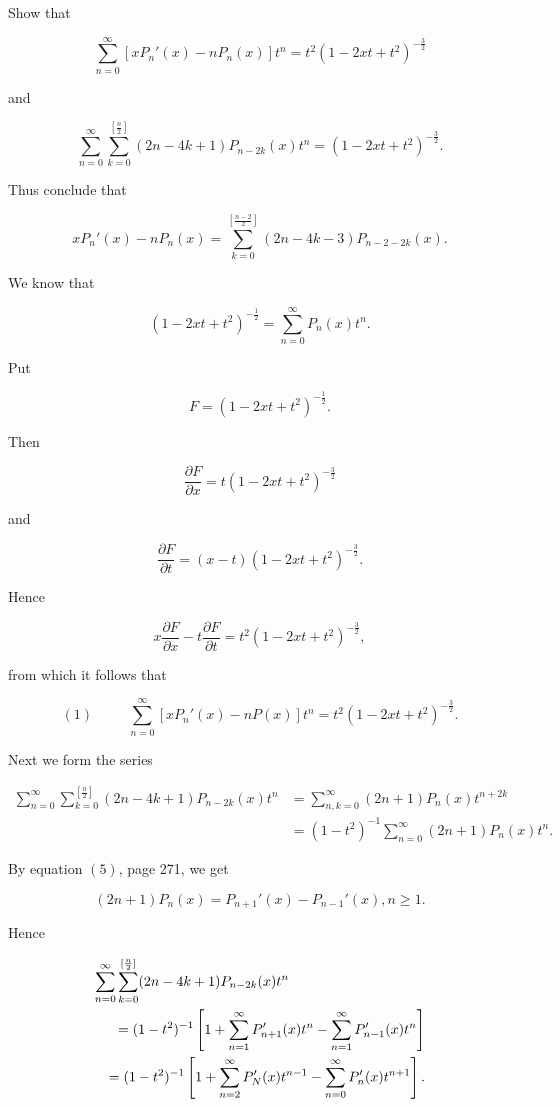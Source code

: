 \begin{problem}\label{problem4chapter10}
Show that

$$\displaystyle\sum_{n=0}^{\infty} [xP_n'(x) - nP_n(x)]t^n = t^2 (1-2xt+t^2)^{-\frac{3}{2}}$$

and

$$\displaystyle\sum_{n=0}^{\infty} \displaystyle\sum_{k=0}^{[\frac{n}{2}]} (2n-4k+1) P_{n-2k}(x)t^n = (1-2xt+t^2)^{-\frac{3}{2}}.$$

Thus conclude that 

$$xP_n'(x) - nP_n(x) = \displaystyle\sum_{k=0}^{[\frac{n-2}{2}]} (2n-4k-3) P_{n-2-2k}(x).$$
\end{problem}
\begin{solution}
We know that 

$$(1-2xt+t^2)^{-\frac{1}{2}} = \displaystyle\sum_{n=0}^{\infty} P_n(x)t^n.$$

Put

$$F = (1-2xt+t^2)^{-\frac{1}{2}}.$$

Then

$$\dfrac{\partial F}{\partial x} = t(1-2xt+t^2)^{-\frac{3}{2}}$$

and

$$\dfrac{\partial F}{\partial t} = (x-t) (1- 2xt+t^2)^{-\frac{3}{2}}.$$

Hence

$$x \dfrac{\partial F}{\partial x} - t \dfrac{\partial F}{\partial t} = t^2 (1-2xt+t^2)^{-\frac{3}{2}},$$

from which it follows that

$$(1) \hspace{30pt} \displaystyle\sum_{n=0}^{\infty} [x P_n'(x) - nP(x)] t^n = t^2 (1-2xt+t^2)^{-\frac{3}{2}}.$$

Next we form the series

$$\begin{array}{ll}
\displaystyle\sum_{n=0}^{\infty} \displaystyle\sum_{k=0}^{[\frac{n}{2}]} (2n-4k+1)P_{n-2k}(x) t^n &= \displaystyle\sum_{n,k=0}^{\infty} (2n+1)P_n(x) t^{n+2k} \\
&= (1-t^2)^{-1} \displaystyle\sum_{n=0}^{\infty} (2n+1)P_n(x)t^n.
\end{array}$$

By equation $(5)$, page 271, we get

$$(2n+1)P_n(x) = P_{n+1}'(x) - P_{n-1}'(x), n \geq 1.$$

Hence

\begin{eqnarray*}
\lefteqn{\displaystyle\sum_{n=0}^{\infty} \displaystyle\sum_{k=0}^{[\frac{n}{2}]} (2n-4k+1) P_{n-2k}(x)t^n} \\
& &= (1-t^2)^{-1} \left[ 1 + \displaystyle\sum_{n=1}^{\infty} P_{n+1}'(x)t^n - \displaystyle\sum_{n=1}^{\infty} P_{n-1}'(x)t^n \right] \\
& &= (1-t^2)^{-1} \left[ 1 + \displaystyle\sum_{n=2}^{\infty} P_N'(x) t^{n-1} - \displaystyle\sum_{n=0}^{\infty} P_n'(x) t^{n+1} \right].
\end{eqnarray*}


\end{solution}
